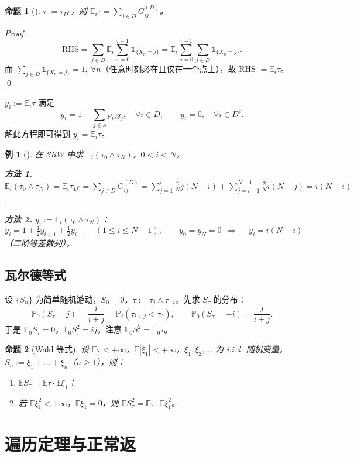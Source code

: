 \documentclass[lang=cn,10pt,newtx,thmcnt=chapter,mode=simple]{vividbook}
\providecommand{\E}{}\renewcommand{\E}{\mathbb{E}}
\providecommand{\Pp}{}\renewcommand{\Pp}{\mathbb{P}}
\newcommand{\ind}[1]{\mathbf{1}_{\{#1\}}}
\newcommand{\darr}{\;\Rightarrow\;}
\theoremstyle{vividthm}
\newtheorem*{vividproposition}{命题}
\theoremstyle{vividdef}
\theoremstyle{vividexa}
\newtheorem*{vividexample}{例}
\theoremstyle{vividrem}
\renewenvironment{proposition}[1][]{\begin{vividproposition}[#1]}{\end{vividproposition}}
\newenvironment{example}[1][]{\begin{vividexample}[#1]}{\end{vividexample}}
\begin{document}
\begin{proposition}
$\tau:=\tau_{D^c}$，则 $\E_i\tau=\sum_{j\in D}G_{ij}^{(D)}$。
\end{proposition}

\begin{proof}
\[
\text{RHS}=\sum_{j\in D}\E_i\sum_{n=0}^{\tau-1}\ind{X_n=j}
=\E_i\sum_{n=0}^{\tau-1}\sum_{j\in D}\ind{X_n=j}.
\]
而 $\sum_{j\in D}\ind{X_n=j}=1,\ \forall n$（任意时刻必在且仅在一个点上），故 RHS $=\E_i\tau$。 \qed
\end{proof}

$y_i:=\E_i\tau$ 满足
\[
y_i=1+\sum_{j\in S}p_{ij}y_j,\quad\forall i\in D;
\qquad
y_i=0,\quad\forall i\in D^c .
\]
解此方程即可得到 $y_i=\E_i\tau$。

\begin{example}
在 SRW 中求 $\E_i(\tau_0\wedge\tau_N)$，$0<i<N$。

\textbf{方法 1.} $\E_i(\tau_0\wedge\tau_N)=\E_i\tau_{D^c}=\sum_{j\in D}G_{ij}^{(D)}
=\sum_{j=1}^{i}\frac2Nj(N-i)+\sum_{j=i+1}^{N-1}\frac2Ni(N-j)=i(N-i)$.

\textbf{方法 2.} $y_i:=\E_i(\tau_0\wedge\tau_N)$：
\[
y_i=1+\tfrac12y_{i+1}+\tfrac12y_{i-1}\quad(1\le i\le N-1),
\qquad y_0=y_N=0
\ \darr\quad y_i=i(N-i)
\]
（二阶等差数列）。
\end{example}

\subsection{瓦尔德等式}

设 $\{S_n\}$ 为简单随机游动，$S_0=0$，$\tau:=\tau_j\wedge\tau_{-i}$。先求 $S_\tau$ 的分布：
\[
\Pp_0(S_\tau=j)=\frac{i}{i+j}=\Pp_i(\tau_{i+j}<\tau_0),
\qquad
\Pp_0(S_\tau=-i)=\frac{j}{i+j}.
\]
于是 $\E_0S_\tau=0$，$\E_0S_\tau^2=ij$。注意 $\E_0S_\tau^2=\E_0\tau$。

\begin{proposition}[Wald 等式]
设 $\E\tau<+\infty$，$\E|\xi_1|<+\infty$，$\xi_1,\xi_2,\dots$ 为 i.i.d. 随机变量，$S_n:=\xi_1+\dots+\xi_n$（$n\ge1$），则：
\begin{enumerate}
  \item $\E S_\tau=\E\tau\cdot\E\xi_1$；
  \item 若 $\E\xi_1^2<+\infty$，$\E\xi_1=0$，则 $\E S_\tau^2=\E\tau\cdot\E\xi_1^2$。
\end{enumerate}
\end{proposition}

\section{遍历定理与正常返}
\end{document}
